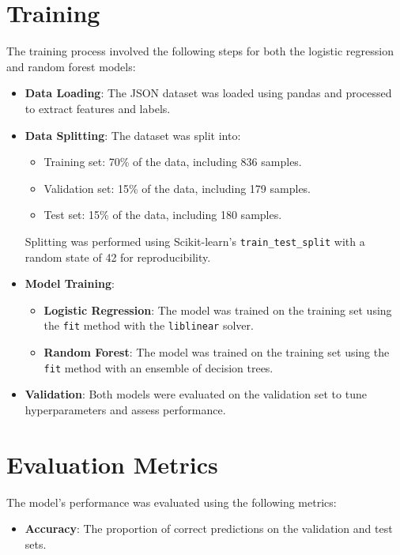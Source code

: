 \documentclass[12pt, a4paper]{article}
\begin{document}
\section{Training}
The training process involved the following steps for both the logistic regression and random forest models:

\begin{itemize}
    \item \textbf{Data Loading}: The JSON dataset was loaded using pandas and processed to extract features and labels.
    \item \textbf{Data Splitting}: The dataset was split into:
        \begin{itemize}
            \item Training set: 70\% of the data, including 836 samples.
            \item Validation set: 15\% of the data, including 179 samples.
            \item Test set: 15\% of the data, including 180 samples.
        \end{itemize}
        Splitting was performed using Scikit-learn's \texttt{train\_test\_split} with a random state of 42 for reproducibility.
    \item \textbf{Model Training}:
        \begin{itemize}
            \item \textbf{Logistic Regression}: The model was trained on the training set using the \texttt{fit} method with the \texttt{liblinear} solver.
            \item \textbf{Random Forest}: The model was trained on the training set using the \texttt{fit} method with an ensemble of decision trees.
        \end{itemize}
    \item \textbf{Validation}: Both models were evaluated on the validation set to tune hyperparameters and assess performance.
\end{itemize}

\section{Evaluation Metrics}
The model’s performance was evaluated using the following metrics:

\begin{itemize}
    \item \textbf{Accuracy}: The proportion of correct predictions on the validation and test sets.
\end{itemize}
\end{document}
